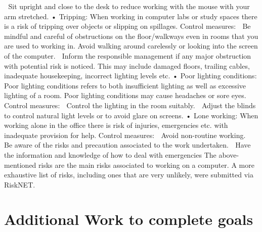 \documentclass[a4paper,12pt]{report}
\begin{document}
	Sit upright and close to the desk to reduce working with the mouse with your arm stretched.
•	Tripping: When working in computer labs or study spaces there is a risk of tripping over objects or slipping on spillages.
Control measures:
	Be mindful and careful of obstructions on the floor/walkways even in rooms that you are used to working in. Avoid walking around carelessly or looking into the screen of the computer.
	Inform the responsible management if any major obstruction with potential risk is noticed. This may include damaged floors, trailing cables, inadequate housekeeping, incorrect lighting levels etc.
•	Poor lighting conditions: Poor lighting conditions refers to both insufficient lighting as well as excessive lighting of a room. Poor lighting conditions may cause headaches or sore eyes.
Control measures:
	Control the lighting in the room suitably.
	Adjust the blinds to control natural light levels or to avoid glare on screens.
•	Lone working: When working alone in the office there is risk of injuries, emergencies etc. with inadequate provision for help.
Control measures:
	Avoid non-routine working.
	Be aware of the risks and precaution associated to the work undertaken.
	Have the information and knowledge of how to deal with emergencies
The above-mentioned risks are the main risks associated to working on a computer. A more exhaustive list of risks, including ones that are very unlikely, were submitted via RiskNET.

\section{Additional Work to complete goals}
\end{document}
